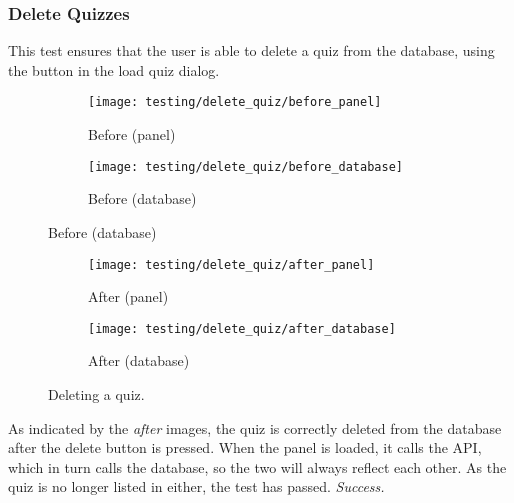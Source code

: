 \subsubsection{Delete Quizzes}
This test ensures that the user is able to delete a quiz from the database, using the button in the load quiz dialog.

\begin{figure}[!htbp]
\centering
\begin{subfigure}{0.5\textwidth}
  \centering
  \texttt{[image: testing/delete\_quiz/before\_panel]}
  \caption{Before (panel)}
  \label{fig:sub1}
\end{subfigure}%
\begin{subfigure}{0.5\textwidth}
  \centering
  \texttt{[image: testing/delete\_quiz/before\_database]}
  \caption{Before (database)}
  \label{fig:sub2}
\end{subfigure}
\label{fig:test}
\end{figure}

\begin{figure}[!htbp]
\centering
\begin{subfigure}{0.5\textwidth}
  \centering
  \texttt{[image: testing/delete\_quiz/after\_panel]}
  \setcounter{subfigure}{2}%
  \caption{After (panel)}
  \label{fig:sub1}
\end{subfigure}%
\begin{subfigure}{0.5\textwidth}
  \centering
  \texttt{[image: testing/delete\_quiz/after\_database]}
  \setcounter{subfigure}{3}%
  \caption{After (database)}
  \label{fig:sub2}
\end{subfigure}
\caption{Deleting a quiz.}
\label{fig:test}
\end{figure}

As indicated by the \textit{after} images, the quiz is correctly deleted from the database after the delete button is pressed. When the panel is loaded, it calls the API, which in turn calls the database, so the two will always reflect each other. As the quiz is no longer listed in either, the test has passed. \textit{Success.}


